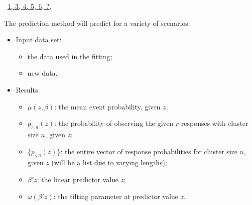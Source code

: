 \documentclass[reqno]{amsart}
\renewcommand{\NWlink}[2]{\hyperlink{#1}{#2}}
\begin{document}
\begin{flushleft}
\begin{list}{}{}
\mbox{}\verb@  if (beta) idx <- c(idx, 1:p)@\\
\mbox{}\verb@  if (f0) idx <- c(idx, (p+1):m)@\\
\mbox{}\verb@  @\\
\mbox{}\verb@  vc <- object$vcov[idx,idx]@\\
\mbox{}\verb@  vc@\\
\mbox{}\verb@}@\\
\mbox{}\verb@@\\
\mbox{}\verb@#' @{\tt @}\verb@rdname coef.spglm@\\
\mbox{}\verb@#'@\\
\mbox{}\verb@#' @{\tt @}\verb@importFrom stats logLik@\\
\mbox{}\verb@#' @{\tt @}\verb@export@\\
\mbox{}\verb@logLik.spglm <- function(object, ...){@\\
\mbox{}\verb@  object$loglik@\\
\mbox{}\verb@}@\\
\mbox{}\verb@                              @\\
\mbox{}\verb@@{\NWsep}
\end{list}
\vspace{-1.5ex}
\footnotesize
\begin{list}{}{\setlength{\itemsep}{-\parsep}\setlength{\itemindent}{-\leftmargin}}
\item \NWtxtFileDefBy\ \NWlink{nuweb1}{1}\NWlink{nuweb3}{, 3}\NWlink{nuweb4}{, 4}\NWlink{nuweb5}{, 5}\NWlink{nuweb6}{, 6}\NWlink{nuweb?}{, ?}.

\item{}
\end{list}
\vspace{4ex}
\end{flushleft}
The prediction method will predict for a variety of scenarios:
\begin{itemize}
\item Input data set:
  \begin{itemize}
    \item the data used in the fitting;
    \item new data.
  \end{itemize}
\item Results:
  \begin{itemize}
    \item $\mu(z,\beta)$: the mean event probability, given $z$;
    \item $p_{r,n}(z)$: the probability of observing the given $r$ responses with cluster size $n$, given $z$;
    \item $\{p_{\cdot,n}(z)\}$: the entire vector of response probabilities for cluster size $n$, given $z$ (will be a list due to varying lengths);
    \item $\beta'z$: the linear predictor value $z$;
    \item $\omega(\beta'z)$: the tilting parameter at predictor value $z$.
  \end{itemize}
\end{itemize}
\end{document}
